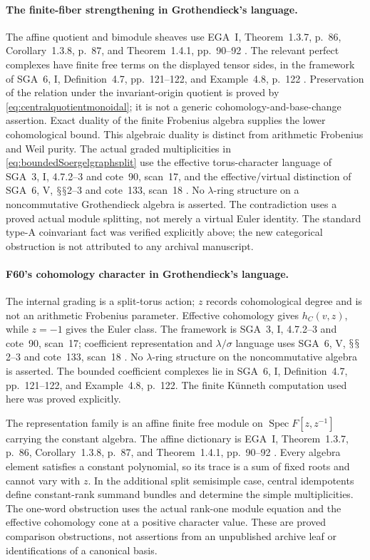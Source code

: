 \documentclass[11pt,a4paper]{article}
\renewcommand{\S}{\ensuremath{\mathsection}}
\newcommand{\fid}[1]{\textsf{#1}}\newcommand{\gate}[1]{\textsf{#1}}
\theoremstyle{named}\newtheorem{finding}{Finding}[section]
\theoremstyle{definition}\newtheorem{definition}[finding]{Definition}
\theoremstyle{remark}\newtheorem{remark}[finding]{Remark}
\begin{document}
\paragraph{The finite-fiber strengthening in Grothendieck's language.}
The affine quotient and bimodule sheaves use EGA~I,
Theorem~1.3.7, p.~86, Corollary~1.3.8, p.~87, and
Theorem~1.4.1, pp.~90--92 \cite{EGA}.
The relevant perfect complexes have finite free terms
on the displayed tensor sides, in the framework of
SGA~6, I, Definition~4.7, pp.~121--122, and
Example~4.8, p.~122 \cite{SGA6}.
Preservation of the relation under the invariant-origin
quotient is proved by
\eqref{eq:centralquotientmonoidal}; it is not a generic
cohomology-and-base-change assertion. Exact duality of
the finite Frobenius algebra supplies the lower
cohomological bound. This algebraic duality is distinct
from arithmetic Frobenius and Weil purity.
The actual graded multiplicities in
\eqref{eq:boundedSoergelgraphsplit} use the effective
torus-character language of SGA~3, I, 4.7.2--3 and
cote~90, scan~17, and the effective/virtual distinction
of SGA~6, V, \S\S2--3 and cote~133, scan~18
\cite{SGA3,SGA6,Archive}.
No \(\lambda\)-ring structure on a noncommutative
Grothendieck algebra is asserted. The contradiction
uses a proved actual module splitting, not merely
a virtual Euler identity. The standard type-A
coinvariant fact was verified explicitly above; the
new categorical obstruction is not attributed to
any archival manuscript.

\paragraph{\fid{F60}'s cohomology character in Grothendieck's language.}
The internal grading is a split-torus action; \(z\) records
cohomological degree and is not an arithmetic Frobenius parameter.
Effective cohomology gives \(h_C(v,z)\), while \(z=-1\)
gives the Euler class.
The framework is SGA~3, I, 4.7.2--3 and cote~90, scan~17;
coefficient representation and \(\lambda/\sigma\) language
uses SGA~6, V, \S\S2--3 and cote~133, scan~18
\cite{SGA3,SGA6,Archive}.
No \(\lambda\)-ring structure on the noncommutative algebra
is asserted.
The bounded coefficient complexes lie in SGA~6, I,
Definition~4.7, pp.~121--122, and Example~4.8, p.~122.
The finite K\"unneth computation used here was proved explicitly.

The representation family is an affine finite free module on
\(\operatorname{Spec}F[z,z^{-1}]\) carrying the constant algebra.
The affine dictionary is EGA~I, Theorem~1.3.7, p.~86,
Corollary~1.3.8, p.~87, and Theorem~1.4.1, pp.~90--92
\cite{EGA}.
Every algebra element satisfies a constant polynomial, so its
trace is a sum of fixed roots and cannot vary with \(z\).
In the additional split semisimple case, central idempotents
define constant-rank summand bundles and determine the simple
multiplicities.
The one-word obstruction uses the actual rank-one module equation
and the effective cohomology cone at a positive character value.
These are proved comparison obstructions, not assertions from an
unpublished archive leaf or identifications of a canonical basis.
\end{document}
